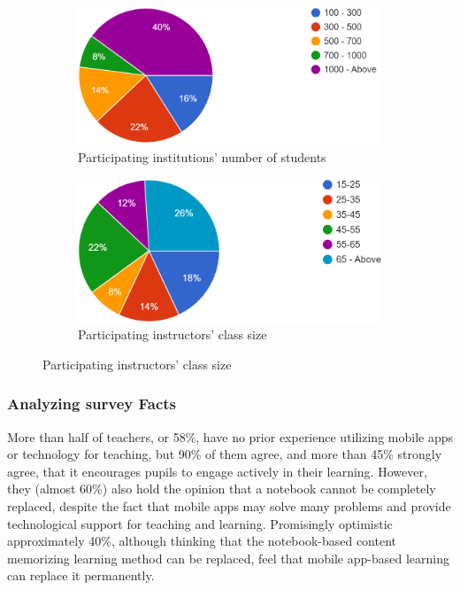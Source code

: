 \documentclass[sn-mathphys,Numbered]{sn-jnl}%
\theoremstyle{thmstyleone}%
\theoremstyle{thmstyletwo}%
\theoremstyle{thmstylethree}%
\begin{document}
\begin{figure}[h!]
\centering
\begin{subfigure}{0.48\textwidth}
    \includegraphics[width=\textwidth]{num_stu.png}
    \caption{Participating institutions' number of students}
    \label{cv}
\end{subfigure}
\hfill
\begin{subfigure}{0.48\textwidth}
    \includegraphics[width=\textwidth]{class_size.png}
    \caption{Participating instructors' class size}
    \label{umass}
\end{subfigure}       
\label{cv_umass}
\end{figure}

\subsubsection{Analyzing survey Facts} 
More than half of teachers, or 58\%, have no prior experience utilizing mobile apps or technology for teaching, but 90\% of them agree, and more than 45\% strongly agree, that it encourages pupils to engage actively in their learning. However, they (almost 60\%) also hold the opinion that a notebook cannot be completely replaced, despite the fact that mobile apps may solve many problems and provide technological support for teaching and learning. Promisingly optimistic approximately 40\%, although thinking that the notebook-based content memorizing learning method can be replaced, feel that mobile app-based learning can replace it permanently.\\
\end{document}
